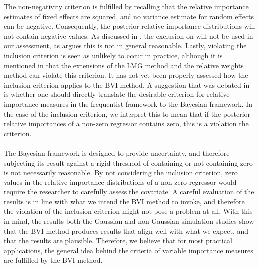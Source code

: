 The non-negativity criterion is fulfilled by recalling that the relative importance estimates of fixed effects are squared, and no variance estimate for random effects can be negative. Consequently, the posterior relative importance distributions will not contain negative values. As discussed in \citet{Arnstad:Relative_variable_importance_in_Bayesian_linear_mixed_models:2024}, the exclusion on will not be used in our assessment, as \citet{gromping_relaimpo} argues this is not in general reasonable. Lastly, violating  the inclusion criterion is seen as unlikely to occur in practice, although it is mentioned in \citet{matre} that the extensions of the LMG method and the relative weights method can violate this criterion. It has not yet been properly assessed how the inclusion criterion applies to the BVI method. A suggestion that was debated in \citep{Arnstad:Relative_variable_importance_in_Bayesian_linear_mixed_models:2024} is whether one should directly translate the desirable criterion for relative importance measures in the frequentist framework to the Bayesian framework. In the case of the inclusion criterion, we interpret this to mean that if the posterior relative importances of a non-zero regressor contains zero, this is a violation the criterion. 
\\
\\
The Bayesian framework is designed to provide uncertainty, and therefore subjecting its result against a rigid threshold of containing or not containing zero is not necessarily reasonable. By not considering the inclusion criterion, zero values in the relative importance distributions of a non-zero regressor would require the researcher to carefully assess the covariate. A careful evaluation of the results is in line with what we intend the BVI method to invoke, and therefore the violation of the inclusion criterion might not pose a problem at all. With this in mind, the results both the Gaussian and non-Gaussian simulation studies show that the BVI method produces results that align well with what we expect, and that the results are plausible. Therefore, we believe that for most practical applications, the general idea behind the criteria of variable importance measures are fulfilled by the BVI method. 
\\
\\

